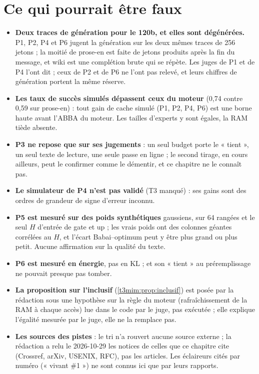 \section{Ce qui pourrait être faux}\label{t3mim:sec:faux}

\begin{faux}
\begin{itemize}
\item \textbf{Deux traces de génération pour le 120b, et elles sont dégénérées.} P1, P2, P4 et P6 jugent la génération sur les deux mêmes traces de 256 jetons ; la moitié de prose-en est faite de jetons produits après la fin du message, et wiki est une complétion brute qui se répète. Les juges de P1 et de P4 l'ont dit ; ceux de P2 et de P6 ne l'ont pas relevé, et leurs chiffres de génération portent la même réserve.
\item \textbf{Les taux de succès simulés dépassent ceux du moteur} (0,74 contre 0,59 sur prose-en) : tout gain de cache simulé (P1, P2, P4, P6) est une borne haute avant l'ABBA du moteur. Les tailles d'experts y sont égales, la RAM tiède absente.
\item \textbf{P3 ne repose que sur ses jugements} : un seul budget porte le « tient », un seul texte de lecture, une seule passe en ligne ; le second tirage, en cours ailleurs, peut le confirmer comme le démentir, et ce chapitre ne le connaît pas.
\item \textbf{Le simulateur de P4 n'est pas validé} (T3 manqué) : ses gains sont des ordres de grandeur de signe d'erreur inconnu.
\item \textbf{P5 est mesuré sur des poids synthétiques} gaussiens, sur 64 rangées et le seul $H$ d'entrée de gate et up ; les vrais poids ont des colonnes géantes corrélées au $H$, et l'écart Babai--optimum peut y être plus grand ou plus petit. Aucune affirmation sur la qualité du texte.
\item \textbf{P6 est mesuré en énergie}, pas en KL ; et son « tient » au préremplissage ne pouvait presque pas tomber.
\item \textbf{La proposition sur l'inclusif} (\cref{t3mim:prop:inclusif}) est posée par la rédaction sous une hypothèse sur la règle du moteur (rafraîchissement de la RAM à chaque accès) lue dans le code par le juge, pas exécutée ; elle explique l'égalité mesurée par le juge, elle ne la remplace pas.
\item \textbf{Les sources des pistes} : le tri n'a rouvert aucune source externe ; la rédaction a relu le 2026-10-29 les notices de celles que ce chapitre cite (Crossref, arXiv, USENIX, RFC), pas les articles. Les éclaireurs cités par numéro (« vivant \#1 ») ne sont connus ici que par leurs rapports.

\end{itemize}
\end{faux}
